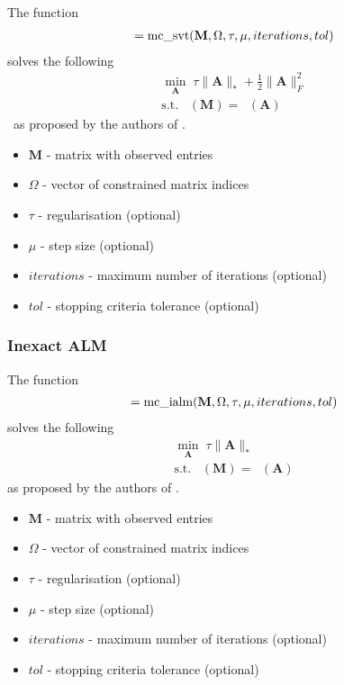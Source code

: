 \documentclass{article}
\DeclareMathOperator*{\pro}{\mathcal P_{\Omega}}
\begin{document}
The function
\begin{align}
[ \mathbf A, \mathbf{f\_values}, \mathbf{stop\_vals} ] = \text{mc\_svt}( \mathbf M, \Omega, \tau, \mu, iterations, tol )\notag 
\end{align}
solves the following
\begin{align}
\min_{\mathbf A} \; \tau \| \mathbf A \|_* +  \frac{1}{2} \| \mathbf{ A } \|_F^2 \\
\text{s.t.} \; \pro (\mathbf M) = \pro (\mathbf A) \nonumber 
\end{align}\
as proposed by the authors of \cite{cai2010singular}.

\begin{itemize}
\item $\mathbf M$ - matrix with observed entries
\item $\Omega$ - vector of constrained matrix indices
\item $\tau$ - regularisation (optional)
\item $\mu$ - step size (optional)
\item $iterations$ - maximum number of iterations (optional)
\item $tol$ - stopping criteria tolerance (optional)
\end{itemize}

\subsubsection{Inexact ALM}
\label{mc_ialm}

The function
\begin{align}
[ \mathbf A, \mathbf{f\_vals}, \mathbf{stop\_vals} ] = \text{mc\_ialm}( \mathbf M, \Omega, \tau, \mu, iterations, tol )\notag 
\end{align}
solves the following
\begin{align}
\min_{\mathbf A} \; \tau \| \mathbf A \|_* \\
\text{s.t.} \; \pro (\mathbf M) = \pro (\mathbf A) \nonumber 
\end{align}
as proposed by the authors of \cite{lin2010augmented}.

\begin{itemize}
\item $\mathbf M$ - matrix with observed entries
\item $\Omega$ - vector of constrained matrix indices
\item $\tau$ - regularisation (optional)
\item $\mu$ - step size (optional)
\item $iterations$ - maximum number of iterations (optional)
\item $tol$ - stopping criteria tolerance (optional)
\end{itemize}
\end{document}
